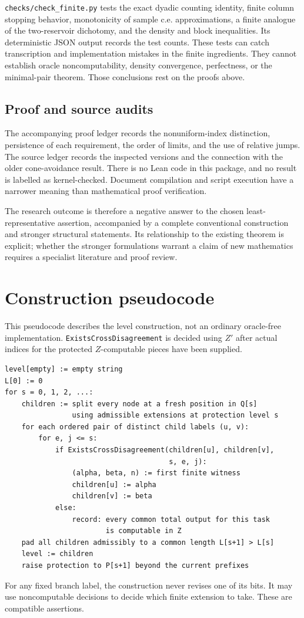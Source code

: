 \documentclass[11pt,a4paper]{article}
\theoremstyle{definition}
\theoremstyle{remark}
\begin{document}
\texttt{checks/check\_finite.py} tests the exact dyadic counting identity,
finite column stopping behavior, monotonicity of sample c.e. approximations,
a finite analogue of the two-reservoir dichotomy, and the density and block
inequalities. Its deterministic JSON output records the test counts.
These tests can catch transcription and implementation mistakes in the
finite ingredients. They cannot establish oracle noncomputability,
density convergence, perfectness, or the minimal-pair theorem. Those
conclusions rest on the proofs above.

\subsection{Proof and source audits}
The accompanying proof ledger records the nonuniform-index distinction,
persistence of each requirement, the order of limits, and the use of
relative jumps. The source ledger records the inspected versions and the
connection with the older cone-avoidance result. There is no Lean code in
this package, and no result is labelled as kernel-checked. Document
compilation and script execution have a narrower meaning than mathematical
proof verification.

The research outcome is therefore a negative answer to the chosen
least-representative assertion, accompanied by a complete conventional
construction and stronger structural statements. Its relationship to the
existing theorem is explicit; whether the stronger formulations warrant
a claim of new mathematics requires a specialist literature and proof review.

\clearpage
\appendix
\section{Construction pseudocode}\label{app:pseudocode}
This pseudocode describes the level construction, not an ordinary
oracle-free implementation. \texttt{ExistsCrossDisagreement} is decided
using $Z'$ after actual indices for the protected $Z$-computable pieces
have been supplied.
\begin{lstlisting}
level[empty] := empty string
L[0] := 0
for s = 0, 1, 2, ...:
    children := split every node at a fresh position in Q[s]
                using admissible extensions at protection level s
    for each ordered pair of distinct child labels (u, v):
        for e, j <= s:
            if ExistsCrossDisagreement(children[u], children[v],
                                       s, e, j):
                (alpha, beta, n) := first finite witness
                children[u] := alpha
                children[v] := beta
            else:
                record: every common total output for this task
                        is computable in Z
    pad all children admissibly to a common length L[s+1] > L[s]
    level := children
    raise protection to P[s+1] beyond the current prefixes
\end{lstlisting}
For any fixed branch label, the construction never revises one of its
bits. It may use noncomputable decisions to decide which finite extension
to take. These are compatible assertions.
\end{document}
